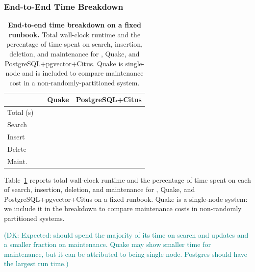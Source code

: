 \documentclass[sigconf,review,anonymous]{acmart}
\newcommand{\dk}[1]{\textcolor{teal}{(DK: #1)}}
\begin{document}
\subsubsection{End-to-End Time Breakdown}
\begin{table}
    \centering
    \caption{\textbf{End-to-end time breakdown on a fixed runbook.} Total wall-clock runtime and the percentage of time spent on search, insertion, deletion, and maintenance for \SystemName{}, Quake, and PostgreSQL+pgvector+Citus. Quake is single-node and is included to compare maintenance cost in a non-randomly-partitioned system. }
    \label{tab:time-breakdown}
    \begin{tabular}{lrrr}
        \toprule
        & \SystemName{} & Quake & PostgreSQL+Citus \\
        \midrule
        Total (s) & \TODO{} & \TODO{} & \TODO{} \\
        Search    & \TODO{} & \TODO{} & \TODO{} \\
        Insert    & \TODO{} & \TODO{} & \TODO{} \\
        Delete    & \TODO{} & \TODO{} & \TODO{} \\
        Maint.    & \TODO{} & \TODO{} & \TODO{} \\
        \bottomrule
    \end{tabular}
\end{table}

Table~\ref{tab:time-breakdown} reports total wall-clock runtime and the percentage of time spent on each of search, insertion, deletion, and maintenance for \SystemName{}, Quake, and PostgreSQL+pgvector+Citus on a fixed runbook. Quake is a single-node system: we include it in the breakdown to compare maintenance costs in non-randomly partitioned systems.

\dk{Expected: \SystemName{} should spend the majority of its time on search and updates and a smaller fraction on maintenance. Quake may show smaller time for maintenance, but it can be attributed to being single node. Postgres should have the largest run time.}


\end{document}
